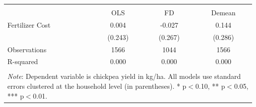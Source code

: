 \begin{tabular}{l*{3}{c}} 
\\[-1.8ex]\hline \hline \\[-1.8ex] 
& \multicolumn{1}{c}{OLS} & 
\multicolumn{1}{c}{FD} & 
\multicolumn{1}{c}{Demean} \\ \midrule
\midrule
Fertilizer Cost     &       0.004         &      -0.027         &       0.144         \\
                    &     (0.243)         &     (0.267)         &     (0.286)         \\
\midrule
Observations        &        1566         &        1044         &        1566         \\
R-squared           &       0.000         &       0.000         &       0.000         \\
\hline \hline \\[-1.8ex] 
\multicolumn{4}{p{\linewidth}}{\small 
\noindent \textit{Note}: Dependent variable 
is chickpea yield in kg/ha. All models use 
standard errors clustered at the 
household level (in parentheses). 
* p$<$0.10, ** p$<$0.05, *** p$<$0.01.} 
\end{tabular}
